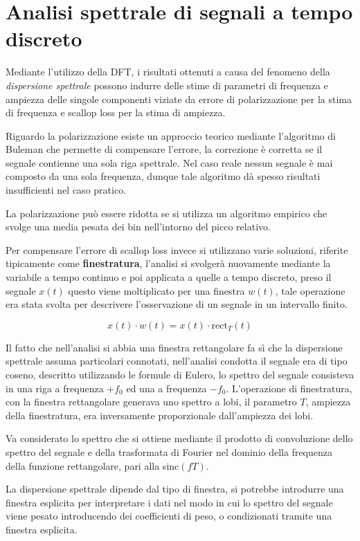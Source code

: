 
\section{Analisi spettrale di segnali a tempo discreto}
Mediante l'utilizzo della DFT, i risultati ottenuti a causa del fenomeno della
\textit{dispersione spettrale} possono indurre delle stime di parametri di
frequenza e ampiezza delle singole componenti viziate da errore di
polarizzazione per la stima di frequenza e scallop loss per la stima di
ampiezza.

Riguardo la polarizzazione esiste un approccio teorico mediante l'algoritmo di
Buleman che permette di compensare l'errore, la correzione è corretta se il
segnale contienne una sola riga spettrale. Nel caso reale nessun segnale è mai
composto da una sola frequenza, dunque tale algoritmo dà spesso risultati
insufficienti nel caso pratico.

La polarizzazione può essere ridotta se si utilizza un algoritmo empirico che
svolge una media pesata dei bin nell'intorno del picco relativo.

Per compensare l'errore di scallop loss invece si utilizzano varie soluzioni,
riferite tipicamente come \textbf{finestratura}, l'analisi si svolgerà
nuovamente mediante la variabile a tempo continuo e poi applicata a quelle a
tempo discreto, preso il segnale $x(t)$ questo viene moltiplicato per una
finestra $w(t)$, tale operazione era stata svolta per descrivere l'osservazione
di un segnale in un intervallo finito.

$$
x(t)\cdot w(t) = x(t)\cdot \text{rect}_T(t)
$$

Il fatto che nell'analisi si abbia una finestra rettangolare fa sì che la
dispersione spettrale assuma particolari connotati, nell'analisi condotta il
segnale era di tipo coseno, descritto utilizzando le formule di Eulero, lo
spettro del segnale consisteva in una riga a frequenza $+f_0$ ed una a
frequenza $-f_0$. L'operazione di finestratura, con la finestra rettangolare
generava uno spettro a lobi, il parametro $T$, ampiezza della finestratura, era
inversamente proporzionale dall'ampiezza dei lobi.

Va considerato lo spettro che si ottiene mediante il prodotto di convoluzione
dello spettro del segnale e della trasformata di Fourier nel dominio della
frequenza della funzione rettangolare, pari alla sinc$(fT)$.

La dispersione spettrale dipende dal tipo di finestra, si potrebbe introdurre
una finestra esplicita per interpretare i dati nel modo in cui lo spettro del
segnale viene pesato introducendo dei coefficienti di peso, o condizionati
tramite una finestra esplicita.

